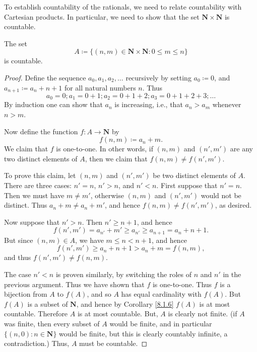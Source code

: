 \begin{note}
To establish countability of the rationals, we need to relate countability with Cartesian products.
In particular, we need to show that the set \(\mathbf{N} \times \mathbf{N}\) is countable.
\end{note}

\begin{lemma}\label{8.1.12}
The set
\[
    A \coloneqq \{(n, m) \in \mathbf{N} \times \mathbf{N} : 0 \leq m \leq n\}
\]
is countable.
\end{lemma}

\begin{proof}
Define the sequence \(a_0, a_1, a_2, \dots\) recursively by setting \(a_0 \coloneqq 0\), and \(a_{n + 1} \coloneqq a_n + n + 1\) for all natural numbers \(n\).
Thus
\[
    a_0 = 0; a_1 = 0 + 1; a_2 = 0 + 1 + 2; a_3 = 0 + 1 + 2 + 3; \dots
\]
By induction one can show that \(a_n\) is increasing, i.e., that \(a_n > a_m\) whenever \(n > m\).

Now define the function \(f : A \to \mathbf{N}\) by
\[
    f(n, m) \coloneqq a_n + m.
\]
We claim that \(f\) is one-to-one.
In other words, if \((n, m)\) and \((n', m')\) are any two distinct elements of \(A\), then we claim that \(f(n, m) \neq f(n', m')\).

To prove this claim, let \((n, m)\) and \((n', m')\) be two distinct elements of \(A\).
There are three cases: \(n' = n\), \(n' > n\), and \(n' < n\).
First suppose that \(n' = n\).
Then we must have \(m \neq m'\), otherwise \((n, m)\) and \((n', m')\) would not be distinct.
Thus \(a_n + m \neq a_n + m'\), and hence \(f(n, m) \neq f(n', m')\), as desired.

Now suppose that \(n' > n\).
Then \(n' \geq n + 1\), and hence
\[
    f(n', m') = a_{n'} + m' \geq a_{n'} \geq a_{n + 1} = a_n + n + 1.
\]
But since \((n, m) \in A\), we have \(m \leq n < n + 1\), and hence
\[
    f(n', m') \geq a_n + n + 1 > a_n + m = f(n, m),
\]
and thus \(f(n', m') \neq f(n, m)\).

The case \(n' < n\) is proven similarly, by switching the roles of \(n\) and \(n'\) in the previous argument.
Thus we have shown that \(f\) is one-to-one.
Thus \(f\) is a bijection from \(A\) to \(f(A)\), and so \(A\) has equal cardinality with \(f(A)\).
But \(f(A)\) is a subset of \(\mathbf{N}\), and hence by Corollary \ref{8.1.6} \(f(A)\) is at most countable.
Therefore \(A\) is at most countable.
But, \(A\) is clearly not finite.
(if \(A\) was finite, then every subset of \(A\) would be finite, and in particular \(\{(n, 0) : n \in \mathbf{N}\}\) would be finite, but this is clearly countably infinite, a contradiction.)
Thus, \(A\) must be countable.
\end{proof}

